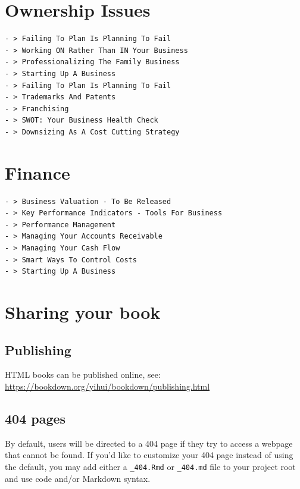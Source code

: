 \documentclass[
]{book}
\begin{document}
\hypertarget{ownership-issues}{%
\chapter{Ownership Issues}\label{ownership-issues}}

\begin{verbatim}
- > Failing To Plan Is Planning To Fail
- > Working ON Rather Than IN Your Business
- > Professionalizing The Family Business
- > Starting Up A Business
- > Failing To Plan Is Planning To Fail
- > Trademarks And Patents
- > Franchising
- > SWOT: Your Business Health Check
- > Downsizing As A Cost Cutting Strategy   
\end{verbatim}

\hypertarget{finance}{%
\chapter{Finance}\label{finance}}

\begin{verbatim}
- > Business Valuation - To Be Released
- > Key Performance Indicators - Tools For Business
- > Performance Management
- > Managing Your Accounts Receivable
- > Managing Your Cash Flow
- > Smart Ways To Control Costs
- > Starting Up A Business
\end{verbatim}

\hypertarget{sharing-your-book}{%
\chapter{Sharing your book}\label{sharing-your-book}}

\hypertarget{publishing}{%
\section{Publishing}\label{publishing}}

HTML books can be published online, see: \url{https://bookdown.org/yihui/bookdown/publishing.html}

\hypertarget{pages}{%
\section{404 pages}\label{pages}}

By default, users will be directed to a 404 page if they try to access a webpage that cannot be found. If you'd like to customize your 404 page instead of using the default, you may add either a \texttt{\_404.Rmd} or \texttt{\_404.md} file to your project root and use code and/or Markdown syntax.
\end{document}

